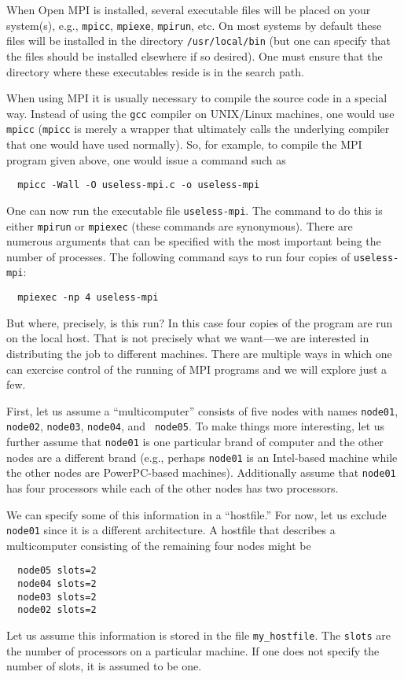 When Open MPI is installed, several executable files will be placed on
your system(s), e.g., {\tt mpicc}, {\tt mpiexe}, {\tt mpirun}, etc.
On most systems by default these files will be installed in the
directory {\tt /usr/local/bin} (but one can specify that the files
should be installed elsewhere if so desired).  One must ensure that
the directory where these executables reside is in the search path.

When using MPI it is usually necessary to compile the source code in a
special way.  Instead of using the {\tt gcc} compiler on UNIX/Linux
machines, one would use {\tt mpicc} ({\tt mpicc} is merely a wrapper
that ultimately calls the underlying compiler that one would have used
normally).  So, for example, to compile the MPI program given above,
one would issue a command such as
\begin{verbatim}
  mpicc -Wall -O useless-mpi.c -o useless-mpi
\end{verbatim}

One can now run the executable file {\tt useless-mpi}.  The command to
do this is either {\tt mpirun} or {\tt mpiexec} (these commands are
synonymous).  There are numerous
arguments that can be specified with the most important being the
number of processes.  The following command says to run four copies of
{\tt useless-mpi}:
\begin{verbatim}
  mpiexec -np 4 useless-mpi
\end{verbatim}
But where, precisely, is this run?  In this case four copies of the
program are run on the local host.  That is not precisely what we
want---we are interested in distributing the job to different
machines.  There are multiple ways in which one can exercise control
of the running of MPI programs and we will explore just a few.

First, let us assume a ``multicomputer'' consists of five nodes with
names {\tt node01}, {\tt node02}, {\tt node03}, {\tt node04}, and {\tt
  node05}.  To make things more interesting, let us further assume
that {\tt node01} is one particular brand of computer and the other
nodes are a different brand (e.g., perhaps {\tt node01} is an
Intel-based machine while the other nodes are PowerPC-based machines).
Additionally assume that {\tt node01} has four processors while each
of the other nodes has two processors.

We can specify some of this information in a ``hostfile.''  For now, let us
exclude {\tt node01} since it is a different architecture.  A hostfile
that describes a multicomputer consisting of the remaining four nodes might be
\begin{verbatim}
  node05 slots=2
  node04 slots=2
  node03 slots=2
  node02 slots=2
\end{verbatim}
Let us assume this information is stored in the file {\tt my\_hostfile}.
The {\tt slots} are the number of processors on a particular machine.
If one does not specify the number of slots, it is assumed to be one.  

